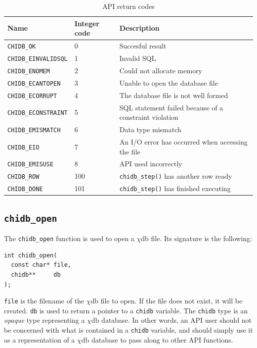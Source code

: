 \documentclass[10pt]{article}
\newcommand{\chidb}{$\chi$\textsf{db}}
\begin{document}
\begin{table}
\caption{API return codes}
\begin{center}
\sffamily
\begin{tabular}{|l|l|l|}
\hline \textbf{Name} & \textbf{Integer code} & \textbf{Description} \\ \hline\hline
\verb+CHIDB_OK+ & 0 & Succesful result \\ \hline
\verb+CHIDB_EINVALIDSQL+ & 1 & Invalid SQL \\ \hline
\verb+CHIDB_ENOMEM+ & 2 & Could not allocate memory \\ \hline
\verb+CHIDB_ECANTOPEN+ & 3 & Unable to open the database file\\ \hline
\verb+CHIDB_ECORRUPT+ & 4 & The database file is not well formed \\ \hline
\verb+CHIDB_ECONSTRAINT+ & 5 & SQL statement failed because of a constraint violation\\ \hline
\verb+CHIDB_EMISMATCH+ & 6 & Data type mismatch\\ \hline
\verb+CHIDB_EIO+ & 7 & An I/O error has occurred when accessing the file \\ \hline
\verb+CHIDB_EMISUSE+ & 8 & API used incorrectly\\ \hline
\verb+CHIDB_ROW+ & 100 & \verb+chidb_step()+ has another row ready\\ \hline
\verb+CHIDB_DONE+ & 101 & \verb+chidb_step()+ has finished executing\\ \hline
\end{tabular}
\end{center}
\label{tab:codes}
\end{table}

\subsection{\texttt{chidb\_open}}

The \verb+chidb_open+ function is used to open a \chidb{} file. Its signature is the following:

\begin{verbatim}
int chidb_open(
  const char* file, 
  chidb**     db
);
\end{verbatim}

\texttt{file} is the filename of the \chidb{} file to open. If the file does not exist, it will be created. \texttt{db} is used to return a pointer to a \texttt{chidb} variable. The \texttt{chidb} type is an \emph{opaque} type representing a \chidb{} database. In other words, an API user should not be concerned with what is contained in a \texttt{chidb} variable, and should simply use it as a representation of a \chidb{} database to pass along to other API functions.
\end{document}
